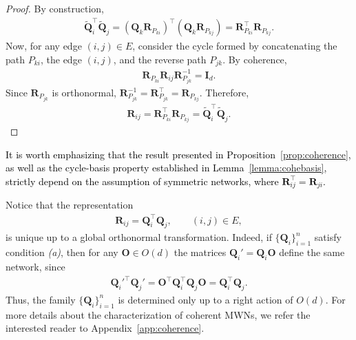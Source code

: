 \documentclass[aps,showpacs,preprintnumbers,amsmath,amssymb,twocolumn,superscriptaddress,floatfix,nofootinbib,10pt,pre]{revtex4-1}
\begin{document}
\begin{proof}
By construction,
\begin{align}
    \widetilde{\mathbf{Q}}_i^\top \widetilde{\mathbf{Q}}_j
    = (\mathbf{Q}_k \mathbf{R}_{P_{ki}})^\top (\mathbf{Q}_k \mathbf{R}_{P_{kj}})
    = \mathbf{R}_{P_{ki}}^\top \mathbf{R}_{P_{kj}}.
\end{align}
Now, for any edge $(i,j) \in E$, consider the cycle formed by 
concatenating the path $P_{ki}$, the edge $(i,j)$, and the reverse 
path $P_{jk}$. By coherence, 
\begin{align}
    \mathbf{R}_{P_{ki}} \mathbf{R}_{ij} \mathbf{R}_{P_{jk}}^{-1} = \mathbf{I}_d.
\end{align}
Since $\mathbf{R}_{P_{jk}}$ is orthonormal, $\mathbf{R}_{P_{jk}}^{-1} = \mathbf{R}_{P_{jk}}^\top = \mathbf{R}_{P_{kj}}$. Therefore,
\begin{align}
    \mathbf{R}_{ij} = \mathbf{R}_{P_{ki}}^\top \mathbf{R}_{P_{kj}} = 
    \widetilde{\mathbf{Q}}_i^\top \widetilde{\mathbf{Q}}_j.
\end{align}
\end{proof}

\textcolor{black}{It is worth emphasizing that the result presented in Proposition~\ref{prop:coherence}, as well as the cycle-basis property established in Lemma~\ref{lemma:cohebasis}, strictly depend on the assumption of symmetric networks, where $\mathbf R_{ij}^\top = \mathbf R_{ji}$.}

Notice that the representation 
\begin{align}
\mathbf{R}_{ij} = \mathbf{Q}_i^\top \mathbf{Q}_j, \qquad (i,j)\in E,
\end{align}
is unique up to a global orthonormal transformation. 
Indeed, if $\{\mathbf{Q}_i\}_{i=1}^n$ satisfy condition \textit{(a)}, then for any 
$\mathbf{O}\in O(d)$ the matrices 
$\mathbf{Q}_i' = \mathbf{Q}_i \mathbf{O}$ 
define the same network, since
\begin{align}
\mathbf{Q}_i'^\top \mathbf{Q}_j' 
= \mathbf{O}^\top \mathbf{Q}_i^\top \mathbf{Q}_j \mathbf{O}
= \mathbf{Q}_i^\top \mathbf{Q}_j.
\end{align}
Thus, the family $\{\mathbf{Q}_i\}_{i=1}^n$ is determined only up to a right action of $O(d)$. For more details about the characterization of coherent MWNs, we refer the interested reader to Appendix~\ref{app:coherence}.\\
\end{document}
